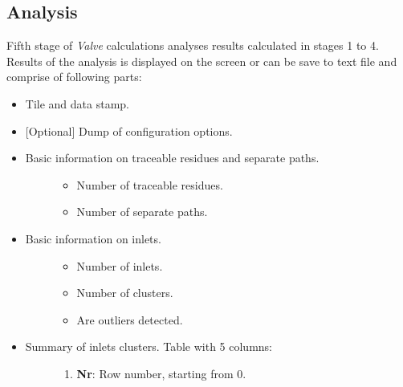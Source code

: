 \documentclass[a4paper,10pt,english]{sphinxmanual}
\begin{document}
\subsection{Analysis}
\label{valve/valve_manual:analysis}
Fifth stage of \emph{Valve} calculations analyses results calculated in stages 1 to 4. Results of the analysis is displayed on the screen or can be save to text file and comprise of following parts:
\begin{itemize}
\item {} 
Tile and data stamp.

\item {} 
{[}Optional{]} Dump of configuration options.

\item {} \begin{description}
\item[{Basic information on traceable residues and separate paths.}] \leavevmode\begin{itemize}
\item {} 
Number of traceable residues.

\item {} 
Number of separate paths.

\end{itemize}

\end{description}

\item {} \begin{description}
\item[{Basic information on inlets.}] \leavevmode\begin{itemize}
\item {} 
Number of inlets.

\item {} 
Number of clusters.

\item {} 
Are outliers detected.

\end{itemize}

\end{description}

\item {} \begin{description}
\item[{Summary of inlets clusters. Table with 5 columns:}] \leavevmode\begin{enumerate}
\item {} 
\textbf{Nr}: Row number, starting from 0.


\end{enumerate}
\end{description}
\end{itemize}
\end{document}
